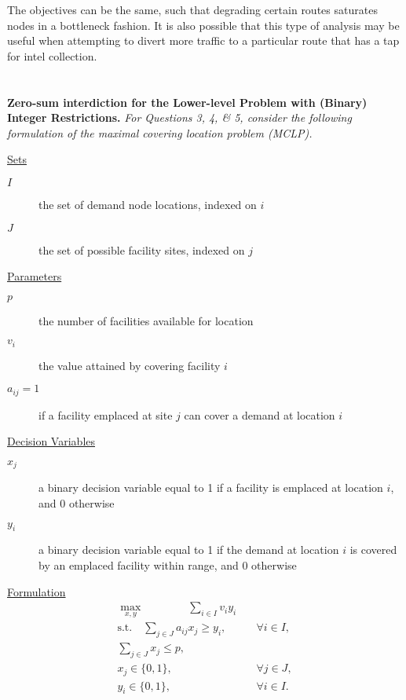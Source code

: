 \documentclass[12pt]{amsart}
\begin{document}
	The objectives can be the same, such that degrading certain routes saturates nodes in a bottleneck fashion.
	It is also possible that this type of analysis may be useful when attempting to divert more traffic to a particular
	route that has a tap for intel collection.


\section{}
\setcounter{subsection}{2}

\textbf{Zero-sum interdiction for the Lower-level Problem with (Binary) Integer Restrictions.} 
\textit{For Questions 3, 4, \& 5, consider the following formulation of the maximal covering 
location problem (MCLP).} \\

\begin{center}
\begin{minipage}{0.75\linewidth}
	
	\underline{Sets}
		\begin{description}
			\item[$I$] the set of demand node locations, indexed on $i$
			\item[$J$] the set of possible facility sites, indexed on $j$
		\end{description}
		
	\underline{Parameters}
		\begin{description}
			\item[$p$]  the number of facilities available for location
			\item[$v_i$] the value attained by covering facility $i$
			\item[$a_{ij}= 1$] if a facility emplaced at site $j$ can cover a demand at location $i$
		\end{description}
		
	\underline{Decision Variables}
		\begin{description}
			\item[$x_j$] a binary decision variable equal to 1 if a facility is emplaced at location $i$, and 0 otherwise
			\item[$y_i$] a binary decision variable equal to 1 if the demand at location $i$ is covered by an emplaced
			facility within range, and 0 otherwise
		\end{description}
	
	\underline{Formulation}
		\begin{align*}
			\max_{x,y} \qquad\qquad \sum_{i\in I} v_iy_i& \\
			\text{s.t.}\quad \sum_{j\in J} a_{ij}x_j \geq y_i,& \quad \forall i\in I, \\
			\sum_{j\in J} x_j \leq p,& \\
			x_j \in \{0,1\},& \quad \forall j\in J, \\
			y_i \in \{0,1\},& \quad \forall i\in I. \\
		\end{align*}
	
\end{minipage}
\end{center}
\end{document}
